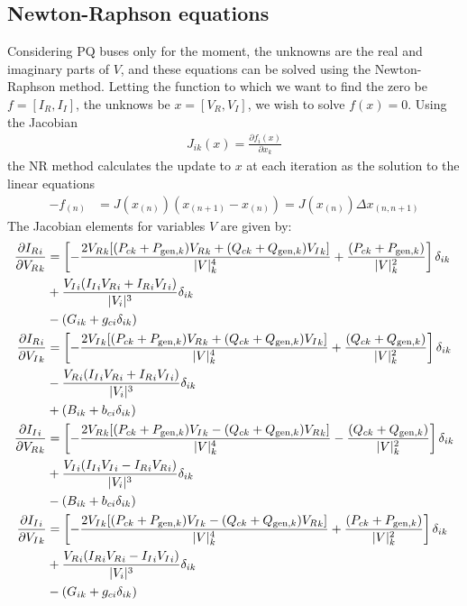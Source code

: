 \documentclass[11pt]{article}
\newcommand{\Vr}{{V_R}}
\newcommand{\Vi}{{V_I}}
\newcommand{\Ir}{{I_R}}
\newcommand{\Ii}{{I_I}}
\begin{document}
\subsection{Newton-Raphson equations}
Considering PQ buses only for the moment, the unknowns are the real and imaginary parts of $V$, and these equations can be solved using the Newton-Raphson method. Letting the function to which we want to find the zero be $f = [\Ir, \Ii]$, the unknows be $x = [\Vr, \Vi]$, we wish to solve $f(x) = 0$. Using the Jacobian
\begin{align}
J_{ik}(x) = \frac{\partial f_i(x)}{\partial x_k}
\end{align}
the NR method calculates the update to $x$ at each iteration as the solution to the linear equations
\begin{align}
-f_{(n)} &= J(x_{(n)})(x_{(n+1)}-x_{(n)}) = J(x_{(n)})\Delta x_{(n,n+1)}
\label{EQ_NR}
\end{align}
The Jacobian elements for variables $V$ are given by:
\begin{align}
	\frac{\partial \Ir_i}{\partial \Vr_{k}} 
		&= \left[-\frac{2\Vr_k[(P_{ck} + P_{\text{gen},k})\Vr_k + (Q_{ck} + Q_{\text{gen},k})\Vi_k]}{|V|_k^4} + \frac{(P_{ck} + P_{\text{gen},k})}{|V|_k^2}\right]\delta_{ik} \notag \\
		&+ \frac{\Vi_i(\Ii_i\Vr_i + \Ir_i\Vi_i)}{|V_i|^3}\delta_{ik} \notag \\
		&- (G_{ik} + g_{ci}\delta_{ik}) \\
	\frac{\partial \Ir_i}{\partial \Vi_{k}} 
		&= \left[-\frac{2\Vi_k[(P_{ck} + P_{\text{gen},k})\Vr_k + (Q_{ck} + Q_{\text{gen},k})\Vi_k]}{|V|_k^4} + \frac{(Q_{ck} + Q_{\text{gen},k})}{|V|_k^2} \right]\delta_{ik} \notag \\
		&- \frac{\Vr_i(\Ii_i\Vr_i + \Ir_i\Vi_i)}{|V_i|^3}\delta_{ik} \notag \\
		&+ (B_{ik} + b_{ci}\delta_{ik}) \\
	\frac{\partial \Ii_i}{\partial \Vr_{k}}
		&= \left[-\frac{2\Vr_k[(P_{ck} + P_{\text{gen},k})\Vi_k - (Q_{ck} + Q_{\text{gen},k})\Vr_k]}{|V|_k^4} - \frac{(Q_{ck} + Q_{\text{gen},k})}{|V|_k^2} \right]\delta_{ik} \notag \\
		&+ \frac{\Vi_i(\Ii_i\Vi_i - \Ir_i\Vr_i)}{|V_i|^3}\delta_{ik} \notag \\
		&- (B_{ik} + b_{ci}\delta_{ik}) \\
	\frac{\partial \Ii_i}{\partial \Vi_{k}}
		&= \left[-\frac{2\Vi_k[(P_{ck} + P_{\text{gen},k})\Vi_k - (Q_{ck} + Q_{\text{gen},k})\Vr_k]}{|V|_k^4} + \frac{(P_{ck} + P_{\text{gen},k})}{|V|_k^2} \right] \delta_{ik} \notag \\
		&+ \frac{\Vr_i(\Ir_i\Vr_i - \Ii_i\Vi_i)}{|V_i|^3}\delta_{ik} \notag \\
		&- (G_{ik} + g_{ci}\delta_{ik})
\end{align}
\end{document}
